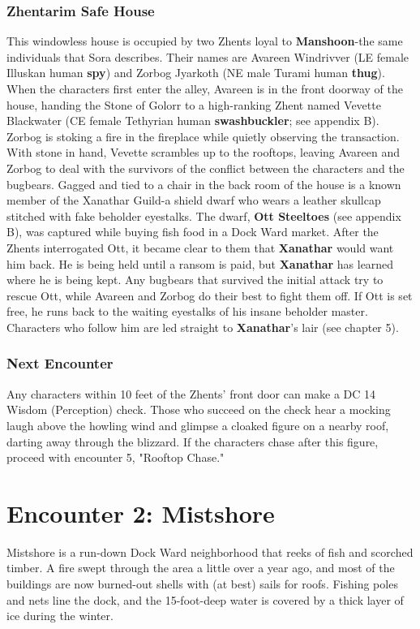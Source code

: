\documentclass[10pt,a4paper,twoside,twocolumn,openany,nodeprecatedcode]{dndbook}
\begin{document}
\subsubsection{Zhentarim Safe House}
This windowless house is occupied by two Zhents loyal to \textbf{Manshoon}-the same individuals that Sora describes. Their names are Avareen Windrivver (LE female Illuskan human \textbf{spy}) and Zorbog Jyarkoth (NE male Turami human \textbf{thug}).
When the characters first enter the alley, Avareen is in the front doorway of the house, handing the Stone of Golorr to a high-ranking Zhent named Vevette Blackwater (CE female Tethyrian human \textbf{swashbuckler}; see appendix B). Zorbog is stoking a fire in the fireplace while quietly observing the transaction. With stone in hand, Vevette scrambles up to the rooftops, leaving Avareen and Zorbog to deal with the survivors of the conflict between the characters and the bugbears.
Gagged and tied to a chair in the back room of the house is a known member of the Xanathar Guild-a shield dwarf who wears a leather skullcap stitched with fake beholder eyestalks. The dwarf, \textbf{Ott Steeltoes} (see appendix B), was captured while buying fish food in a Dock Ward market. After the Zhents interrogated Ott, it became clear to them that \textbf{Xanathar} would want him back. He is being held until a ransom is paid, but \textbf{Xanathar} has learned where he is being kept. Any bugbears that survived the initial attack try to rescue Ott, while Avareen and Zorbog do their best to fight them off. If Ott is set free, he runs back to the waiting eyestalks of his insane beholder master. Characters who follow him are led straight to \textbf{Xanathar}'s lair (see chapter 5).
\subsubsection{Next Encounter}
Any characters within 10 feet of the Zhents' front door can make a DC 14 Wisdom (Perception) check. Those who succeed on the check hear a mocking laugh above the howling wind and glimpse a cloaked figure on a nearby roof, darting away through the blizzard. If the characters chase after this figure, proceed with encounter 5, "Rooftop Chase."
\section{Encounter 2: Mistshore}
Mistshore is a run-down Dock Ward neighborhood that reeks of fish and scorched timber. A fire swept through the area a little over a year ago, and most of the buildings are now burned-out shells with (at best) sails for roofs. Fishing poles and nets line the dock, and the 15-foot-deep water is covered by a thick layer of ice during the winter.
\end{document}

